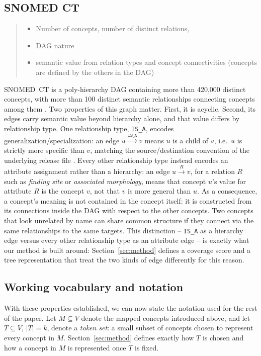 \subsection{SNOMED CT}
\begin{quote}\small\itshape
\begin{itemize}
\item Number of concepts, number of distinct relations,
\item DAG nature
\item semantic value from relation types and concept connectivities (concepts are defined by the others in the DAG)
\end{itemize}
\end{quote}
SNOMED~CT is a poly-hierarchy DAG containing more than 420{,}000
distinct concepts, with more than 100 distinct semantic relationships connecting concepts among
them .
Two properties of this graph matter. First, it is acyclic. Second, its edges
carry semantic value beyond hierarchy alone, and that value differs by
relationship type. One relationship type, \texttt{IS\_A}, encodes
generalization/specialization: an edge $u \xrightarrow{\texttt{IS\_A}} v$
means $u$ is a child of $v$, i.e.\ $u$ is strictly more specific than $v$,
matching the source/destination convention of the underlying release file
. Every
other relationship type instead encodes an attribute assignment rather than
a hierarchy: an edge $u \xrightarrow{R} v$, for a relation $R$ such as
\emph{finding site} or \emph{associated morphology}, means that concept
$u$'s value for attribute $R$ is the concept $v$, not that $v$ is more
general than $u$. As a consequence, a concept's meaning is not contained in
the concept itself: it is constructed from its connections inside the DAG
with respect to the other concepts. Two concepts that look unrelated by
name can share common structure if they connect via the same relationships
to the same targets. This distinction -- \texttt{IS\_A} as a hierarchy edge
versus every other relationship type as an attribute edge -- is exactly
what our method is built around: Section~\ref{sec:method} defines a
coverage score and a tree representation that treat the two kinds of edge
differently for this reason.

\subsection{Working vocabulary and notation}
With these properties established, we can now state the notation used for
the rest of the paper. Let $M \subseteq V$ denote the mapped concepts
introduced above, and let $T \subseteq V$, $|T| = k$, denote a \emph{token
set}: a small subset of concepts chosen to represent every concept in $M$.
Section~\ref{sec:method} defines exactly how $T$ is chosen and how a concept
in $M$ is represented once $T$ is fixed.